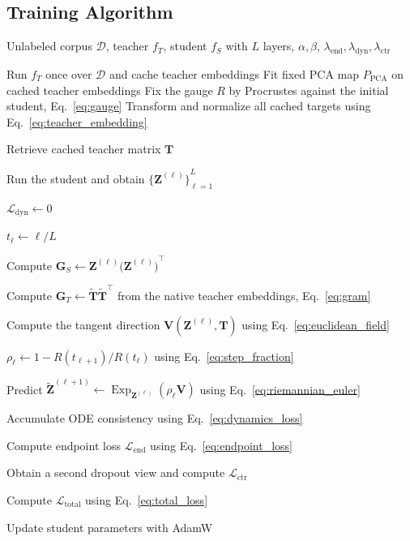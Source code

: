 \documentclass[11pt]{article}
\begin{document}
\subsection{Training Algorithm}\label{sec:algorithm}

\begin{algorithm}[t]
\caption{GeoODE-KD Training}\label{alg:geood}
\begin{algorithmic}[1]
\Require{}
Unlabeled corpus $\mathcal{D}$,
teacher $f_T$,
student $f_S$ with $L$ layers,
$\alpha,\beta$,
$\lambda_{\mathrm{end}},
\lambda_{\mathrm{dyn}},
\lambda_{\mathrm{ctr}}$

\State{} Run $f_T$ once over $\mathcal{D}$ and cache teacher embeddings
\State{} Fit fixed PCA map $P_{\mathrm{PCA}}$ on cached teacher embeddings
\State{} Fix the gauge $R$ by Procrustes against the initial student, Eq.~\eqref{eq:gauge}
\State{} Transform and normalize all cached targets using
Eq.~\eqref{eq:teacher_embedding}

    \State{} Retrieve cached teacher matrix $\mathbf{T}$

    \State{} Run the student and obtain
    ${\bigl\{\mathbf{Z}^{(\ell)}\bigr\}}_{\ell=1}^{L}$

    \State{} $\mathcal{L}_{\mathrm{dyn}}\gets0$

        \State{} $t_\ell\gets \ell/L$

        \State{} Compute
        $\mathbf{G}_S
        \gets
        \mathbf{Z}^{(\ell)}
        {\bigl(\mathbf{Z}^{(\ell)}\bigr)}^\top$

        \State{} Compute
        $\mathbf{G}_T
        \gets
        \widetilde{\mathbf{T}}\widetilde{\mathbf{T}}^\top$
        from the native teacher embeddings, Eq.~\eqref{eq:gram}

        \State{} Compute the tangent direction
        $\mathbf{V}(
            \mathbf{Z}^{(\ell)},
            \mathbf{T}
        )$
        using Eq.~\eqref{eq:euclidean_field}

        \State{} $\rho_\ell\gets 1-R(t_{\ell+1})/R(t_\ell)$
        using Eq.~\eqref{eq:step_fraction}

        \State{} Predict
        $\widetilde{\mathbf{Z}}^{(\ell+1)}
        \gets
        \operatorname{Exp}_{\mathbf{Z}^{(\ell)}}(\rho_\ell\mathbf{V})$
        using Eq.~\eqref{eq:riemannian_euler}

        \State{} Accumulate ODE consistency using
        Eq.~\eqref{eq:dynamics_loss}
    \EndFor{}

    \State{} Compute endpoint loss
    $\mathcal{L}_{\mathrm{end}}$
    using Eq.~\eqref{eq:endpoint_loss}

    \State{} Obtain a second dropout view and compute
    $\mathcal{L}_{\mathrm{ctr}}$

    \State{} Compute
    $\mathcal{L}_{\mathrm{total}}$
    using Eq.~\eqref{eq:total_loss}

    \State{} Update student parameters with AdamW
\EndFor{}
\end{algorithmic}
\end{algorithm}
\end{document}
